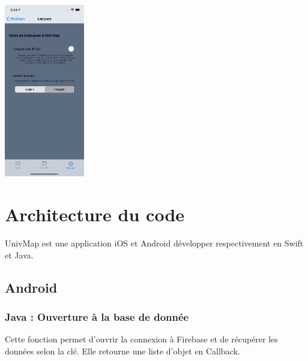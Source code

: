 \documentclass{article}
\begin{document}
\begin{center}
    \includegraphics[width=35mm, scale=0.5]{setting_languageOff.png}
\end{center}



\newpage %



\section{Architecture du code}
UnivMap est une application iOS et Android développer respectivement en Swift et Java.


\subsection{Android} %
\label{subsection:Android} 


\subsubsection{Java : Ouverture à la base de donnée}
\label{subsubsection:Java : Ouverture à la base de donnée} 
Cette fonction permet d'ouvrir la connexion à Firebase et de récupérer les données selon la clé. Elle retourne
une liste d'objet en Callback.
\end{document}
